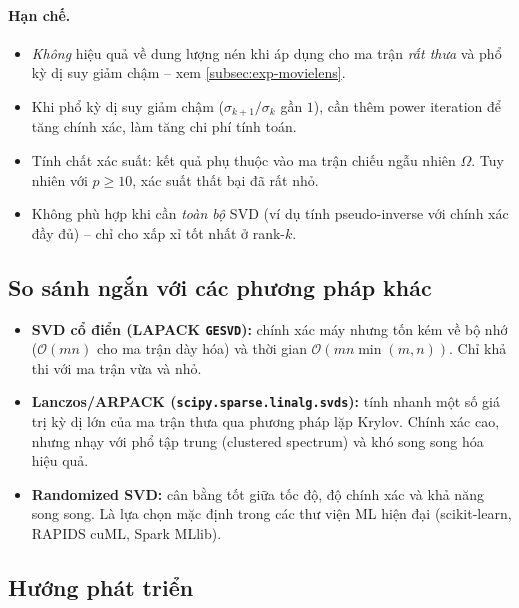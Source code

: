 \paragraph{Hạn chế.}
\begin{itemize}
    \item \emph{Không} hiệu quả về dung lượng nén khi áp dụng cho ma trận
    \emph{rất thưa} và phổ kỳ dị suy giảm chậm -- xem
    \cref{subsec:exp-movielens}.
    \item Khi phổ kỳ dị suy giảm chậm
    ($\sigma_{k+1}/\sigma_k$ gần $1$), cần thêm power iteration để tăng
    chính xác, làm tăng chi phí tính toán.
    \item Tính chất xác suất: kết quả phụ thuộc vào ma trận chiếu ngẫu nhiên
    $\Omega$. Tuy nhiên với $p \ge 10$, xác suất thất bại đã rất nhỏ.
    \item Không phù hợp khi cần \emph{toàn bộ} SVD (ví dụ tính
    pseudo-inverse với chính xác đầy đủ) -- chỉ cho xấp xỉ tốt nhất ở
    rank-$k$.
\end{itemize}

\subsection{So sánh ngắn với các phương pháp khác}\label{subsec:compare}

\begin{itemize}
    \item \textbf{SVD cổ điển (LAPACK \texttt{GESVD}):} chính xác máy nhưng
    tốn kém về bộ nhớ ($\mathcal{O}(mn)$ cho ma trận dày hóa) và thời gian
    $\mathcal{O}(mn\min(m,n))$. Chỉ khả thi với ma trận vừa và nhỏ.

    \item \textbf{Lanczos/ARPACK (\texttt{scipy.sparse.linalg.svds}):} tính
    nhanh một số giá trị kỳ dị lớn của ma trận thưa qua phương pháp lặp
    Krylov. Chính xác cao, nhưng nhạy với phổ tập trung
    (clustered spectrum) và khó song song hóa hiệu quả.

    \item \textbf{Randomized SVD:} cân bằng tốt giữa tốc độ, độ chính xác và
    khả năng song song. Là lựa chọn mặc định trong các thư viện ML hiện đại
    (scikit-learn, RAPIDS cuML, Spark MLlib).
\end{itemize}

\subsection{Hướng phát triển}\label{subsec:future}

